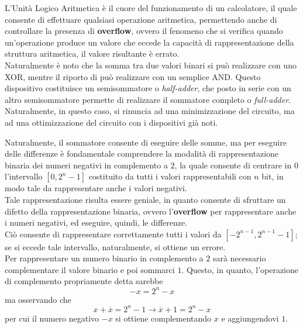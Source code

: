 \documentclass[a4paper]{extarticle}
\begin{document}
\vspace{1em}
\noindent
L'Unità Logico Aritmetica è il cuore del funzionamento di un calcolatore, il quale consente di effettuare qualsiasi operazione aritmetica, permettendo anche di controllare la presenza di \textbf{overflow}, ovvero il fenomeno che si verifica quando un'operazione produce un valore che eccede la capacità di rappresentazione della struttura aritmetica, il valore risultante è errato.\\
Naturalmente è noto che la somma tra due valori binari si può realizzare con uno XOR, mentre il riporto di può realizzare con un semplice AND. Questo dispositivo costituisce un semisommatore o \textit{half-adder}, che posto in serie con un altro semisommatore permette di realizzare il sommatore completo o \textit{full-adder}.\\
Naturalmente, in questo caso, si rinuncia ad una minimizzazione del circuito, ma ad una ottimizzazione del circuito con i dispositivi già noti.

\vspace{1em}
\noindent
Naturalmente, il sommatore consente di eseguire delle somme, ma per eseguire delle differenze è fondamentale comprendere la modalità di rappresentazione binaria dei numeri negativi in complemento a \(2\), la quale consente di centrare in \(0\) l'intervallo \([0, 2^{n} - 1]\) costituito da tutti i valori rappresentabili con \(n\) bit, in modo tale da rappresentare anche i valori negativi.\\
Tale rappresentazione risulta essere geniale, in quanto consente di sfruttare un difetto della rappresentazione binaria, ovvero l'\textbf{overflow} per rappresentare anche i numeri negativi, ed eseguire, quindi, le differenze.\\
Ciò consente di rappresentare correttamente tutti i valori da \([-2^{n - 1}, 2^{n - 1} - 1]\); se si eccede tale intervallo, naturalmente, si ottiene un errore.\\
Per rappresentare un numero binario in complemento a \(2\) sarà necessario complementare il valore binario e poi sommarci \(1\). Questo, in quanto, l'operazione di complemento propriamente detta sarebbe
\[-x = 2^n - x\]
ma osservando che
\[x + \overline{x} = 2^n - 1 \rightarrow \overline{x} + 1= 2^n - x\]
per cui il numero negativo \(-x\) si ottiene complementando \(x\) e aggiungendovi \(1\).\\
\end{document}
